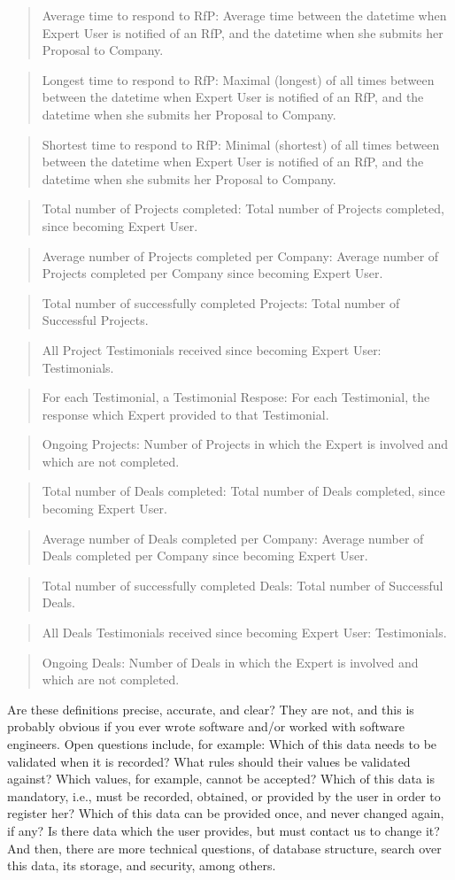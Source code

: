 \documentclass[graybox,envcountchap,sectrefs]{svmono}
\newcommand{\newterm}[1]{\begin{quote}\textsf{#1}\end{quote}}
\begin{document}
\newterm{Average time to respond to RfP: Average time between the datetime when Expert User is notified of an RfP, and the datetime when she submits her Proposal to Company.}
\newterm{Longest time to respond to RfP: Maximal (longest) of all times between between the datetime when Expert User is notified of an RfP, and the datetime when she submits her Proposal to Company.}
\newterm{Shortest time to respond to RfP: Minimal (shortest) of all times between between the datetime when Expert User is notified of an RfP, and the datetime when she submits her Proposal to Company.}
\newterm{Total number of Projects completed: Total number of Projects completed, since becoming Expert User.}
\newterm{Average number of Projects completed per Company: Average number of Projects completed per Company since becoming Expert User.}
\newterm{Total number of successfully completed Projects: Total number of Successful Projects.}
\newterm{All Project Testimonials received since becoming Expert User: Testimonials.}
\newterm{For each Testimonial, a Testimonial Respose: For each Testimonial, the response which Expert provided to that Testimonial.}
\newterm{Ongoing Projects: Number of Projects in which the Expert is involved and which are not completed.}
\newterm{Total number of Deals completed: Total number of Deals completed, since becoming Expert User.}
\newterm{Average number of Deals completed per Company: Average number of Deals completed per Company since becoming Expert User.}
\newterm{Total number of successfully completed Deals: Total number of Successful Deals.}
\newterm{All Deals Testimonials received since becoming Expert User: Testimonials.}
\newterm{Ongoing Deals: Number of Deals in which the Expert is involved and which are not completed.}

Are these definitions precise, accurate, and clear? They are not, and this is probably obvious if you ever wrote software and/or worked with software engineers. Open questions include, for example: Which of this data needs to be validated when it is recorded? What rules should their values be validated against? Which values, for example, cannot be accepted? Which of this data is mandatory, i.e., must be recorded, obtained, or provided by the user in order to register her? Which of this data can be provided once, and never changed again, if any? Is there data which the user provides, but must contact us to change it? And then, there are more technical questions, of database structure, search over this data, its storage, and security, among others. 
\end{document}
